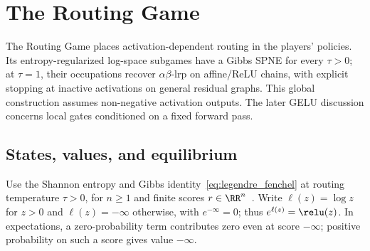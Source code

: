 \section{The Routing Game}\label{ptnb:sec:routing}\label{subsec:routing_game_def}\label{ptnb:app:routing-formal}

The Routing Game places activation-dependent routing in the players' policies. Its entropy-regularized log-space subgames have a Gibbs SPNE for every $\tau>0$; at $\tau=1$, their occupations recover $\alpha\beta$-\ac{lrp} on affine/ReLU chains, with explicit stopping at inactive activations on general residual graphs. This global construction assumes non-negative activation outputs. The later GELU discussion concerns local gates conditioned on a fixed forward pass.

\subsection{States, values, and equilibrium}\label{ptnb:app:routing-kernel}

Use the Shannon entropy and Gibbs identity~\eqref{eq:legendre_fenchel} at routing temperature $\tau>0$,
for $n\geq1$ and finite scores $r\in\RR^n$~\parencite{Geist2019regularized}.
Write $\ell(z)=\log z$ for $z>0$ and $\ell(z)=-\infty$ otherwise, with $e^{-\infty}=0$; thus $e^{\ell(z)}=\relu(z)$. In expectations, a zero-probability term contributes zero even at score $-\infty$; positive probability on such a score gives value $-\infty$.

